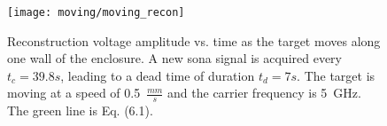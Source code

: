 \begin{figure}[t]
\centering
\texttt{[image: moving/moving\_recon]}
    \caption[Voltage measured during moving reconstructions]{Reconstruction voltage amplitude vs. time as the target moves along one wall of the enclosure. A new sona signal is acquired every $t_c = 39.8s$, leading to a dead time of duration $t_d = 7s$. The target is moving at a speed of 0.5~$\frac{mm}{s}$ and the carrier frequency is 5~GHz. The green line is Eq. (6.1).}
    \label{fig:moving-recon}
\end{figure}
